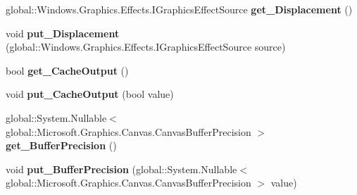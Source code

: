 \begin{DoxyCompactItemize}
\item 
\mbox{\label{class_microsoft_1_1_graphics_1_1_canvas_1_1_effects_1_1_displacement_map_effect_aaf5364680c98ed0f56450c34b38dd81a}} 
global\+::\+Windows.\+Graphics.\+Effects.\+I\+Graphics\+Effect\+Source {\bfseries get\+\_\+\+Displacement} ()
\item 
\mbox{\label{class_microsoft_1_1_graphics_1_1_canvas_1_1_effects_1_1_displacement_map_effect_ae673a7b19adf4c74fc290965e8c469d3}} 
void {\bfseries put\+\_\+\+Displacement} (global\+::\+Windows.\+Graphics.\+Effects.\+I\+Graphics\+Effect\+Source source)
\item 
\mbox{\label{class_microsoft_1_1_graphics_1_1_canvas_1_1_effects_1_1_displacement_map_effect_a98dc9dff78bcf54a0714684a37fac496}} 
bool {\bfseries get\+\_\+\+Cache\+Output} ()
\item 
\mbox{\label{class_microsoft_1_1_graphics_1_1_canvas_1_1_effects_1_1_displacement_map_effect_a6ea6152dfdb5861dd9ddb378972ab881}} 
void {\bfseries put\+\_\+\+Cache\+Output} (bool value)
\item 
\mbox{\label{class_microsoft_1_1_graphics_1_1_canvas_1_1_effects_1_1_displacement_map_effect_a85345dfa5889a8d0eeaa2c0eef0af1f6}} 
global\+::\+System.\+Nullable$<$ global\+::\+Microsoft.\+Graphics.\+Canvas.\+Canvas\+Buffer\+Precision $>$ {\bfseries get\+\_\+\+Buffer\+Precision} ()
\item 
\mbox{\label{class_microsoft_1_1_graphics_1_1_canvas_1_1_effects_1_1_displacement_map_effect_ad6130a57ecf408ba6f8e0e9e37720c01}} 
void {\bfseries put\+\_\+\+Buffer\+Precision} (global\+::\+System.\+Nullable$<$ global\+::\+Microsoft.\+Graphics.\+Canvas.\+Canvas\+Buffer\+Precision $>$ value)
\item 
\mbox{\label{class_microsoft_1_1_graphics_1_1_canvas_1_1_effects_1_1_displacement_map_effect_a2d4615db3853ecd69015f50e6a540a24}} 

\end{DoxyCompactItemize}
